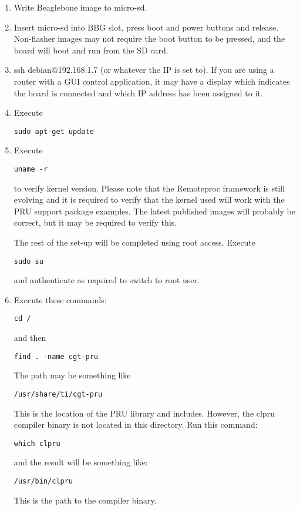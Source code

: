 \begin{enumerate}
\item  Write Beaglebone image to micro-sd.
\item  Insert micro-sd into BBG slot, press boot and power buttons and release.  Non-flasher images may not require the boot button to be pressed, and the board will boot and run from the SD card.
\item  ssh debian@192.168.1.7 (or whatever the IP is set to).  If you are using a router with a GUI control application, it may have a display which indicates the board is connected and which IP address has been assigned to it.
\item  Execute
\begin{verbatim}
sudo apt-get update
\end{verbatim}
\item  Execute
\begin{verbatim}
uname -r
\end{verbatim} 
to verify kernel version.  Please note that the Remoteproc framework is still evolving and it is required to verify that the kernel used will work with the PRU support package examples.  The latest published images will probably be correct, but it may be required to verify this.

The rest of the set-up will be completed using root access.
Execute
\begin{verbatim}
sudo su
\end{verbatim}
and authenticate as required to switch to root user.

\item  Execute these commands:
  \begin{verbatim}
cd /
\end{verbatim} and then 
\begin{verbatim}
find . -name cgt-pru
\end{verbatim}

The path may be something like 
\begin{verbatim}
/usr/share/ti/cgt-pru
\end{verbatim}  

This is the location of the PRU library and includes.
However, the clpru compiler binary is not located in this directory.  Run this command:
\begin{verbatim}
which clpru
\end{verbatim}
and the result will be something like:
\begin{verbatim}
/usr/bin/clpru
\end{verbatim}
This is the path to the compiler binary.


\end{enumerate}

